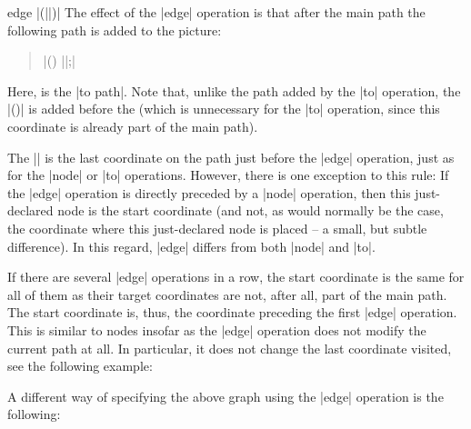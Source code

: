 \begin{pathoperation}{edge}{
     |(||)|}
  The effect of the |edge| operation is that after the main path the
  following path is added to the picture:
  \begin{quote}
    | (\tikztostart) ||;|
  \end{quote}
  Here,  is the |to path|. Note that, unlike the path added
  by the |to| operation, the |(\tikztostart)| is added before the
   (which is unnecessary for the |to| operation, since this
  coordinate is already part of the main path).

  The |\tikztostart| is the last coordinate on the path just before
  the |edge| operation, just as for the |node| or |to| operations.
  However, there is one exception to this rule: If the |edge|
  operation is directly preceded by a |node| operation, then this
  just-declared node is the start coordinate (and not, as would
  normally be the case, the coordinate where this just-declared node
  is placed -- a small, but subtle difference). In this regard, |edge|
  differs from both |node| and |to|.

  If there are several |edge| operations in a row, the start coordinate
  is the same for all of them as their target coordinates are not,
  after all, part of the main path. The start coordinate is, thus, the
  coordinate preceding the first |edge| operation. This is
  similar to nodes insofar as the |edge| operation does not modify the
  current path at all. In particular, it does not change the last
  coordinate visited, see the following example:

\begin{codeexample}[]
\end{codeexample}

  A different way of specifying the above graph using the |edge|
  operation is the following:

\begin{codeexample}[]
\end{codeexample}
\end{pathoperation}

